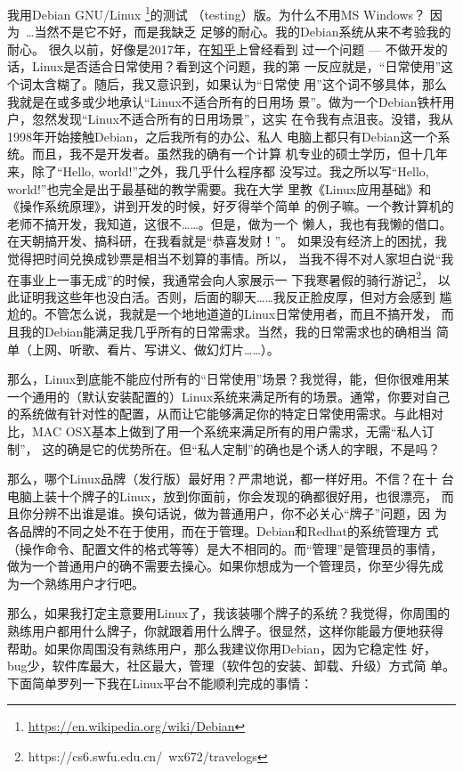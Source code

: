 我用Debian GNU/Linux%
\footnote{\url{https://en.wikipedia.org/wiki/Debian}}的测试
（testing）版。为什么不用MS Windows？ 因为~\ldots 当然不是它不好，而是我缺乏
足够的耐心。我的Debian系统从来不考验我的耐心。
很久以前，好像是2017年，在\href{https://www.zhihu.com}{知乎}上曾经看到
过一个问题 --- 不做开发的话，Linux是否适合日常使用？看到这个问题，我的第
一反应就是，“日常使用”这个词太含糊了。随后，我又意识到，如果认为“日常使
用”这个词不够具体，那么我就是在或多或少地承认“Linux不适合所有的日用场
景”。做为一个Debian铁杆用户，忽然发现“Linux不适合所有的日用场景”，这实
在令我有点沮丧。没错，我从1998年开始接触Debian，之后我所有的办公、私人
电脑上都只有Debian这一个系统。而且，我不是开发者。虽然我的确有一个计算
机专业的硕士学历，但十几年来，除了“Hello, world!”之外，我几乎什么程序都
没写过。我之所以写“Hello, world!”也完全是出于最基础的教学需要。我在大学
里教《Linux应用基础》和《操作系统原理》，讲到开发的时候，好歹得举个简单
的例子嘛。一个教计算机的老师不搞开发，我知道，这很不……。但是，做为一个
懒人，我也有我懒的借口。在天朝搞开发、搞科研，在我看就是“恭喜发财！”。
如果没有经济上的困扰，我觉得把时间兑换成钞票是相当不划算的事情。所以，
当我不得不对人家坦白说“我在事业上一事无成”的时候，我通常会向人家展示一
下我寒暑假的骑行游记\footnote{https://cs6.swfu.edu.cn/~wx672/travelogs}，%
以此证明我这些年也没白活。否则，后面的聊天……我反正脸皮厚，但对方会感到
尴尬的。不管怎么说，我就是一个地地道道的Linux日常使用者，而且不搞开发，
而且我的Debian能满足我几乎所有的日常需求。当然，我的日常需求也的确相当
简单（上网、听歌、看片、写讲义、做幻灯片……）。

那么，Linux到底能不能应付所有的“日常使用”场景？我觉得，能，但你很难用某
一个通用的（默认安装配置的）Linux系统来满足所有的场景。通常，你要对自己
的系统做有针对性的配置，从而让它能够满足你的特定日常使用需求。与此相对
比，MAC OSX基本上做到了用一个系统来满足所有的用户需求，无需“私人订制”，
这的确是它的优势所在。但“私人定制”的确也是个诱人的字眼，不是吗？

那么，哪个Linux品牌（发行版）最好用？严肃地说，都一样好用。不信？在十
台电脑上装十个牌子的Linux，放到你面前，你会发现的确都很好用，也很漂亮，
而且你分辨不出谁是谁。换句话说，做为普通用户，你不必关心“牌子”问题，因
为各品牌的不同之处不在于使用，而在于管理。Debian和Redhat的系统管理方
式（操作命令、配置文件的格式等等）是大不相同的。而“管理”是管理员的事情，
做为一个普通用户的确不需要去操心。如果你想成为一个管理员，你至少得先成
为一个熟练用户才行吧。

那么，如果我打定主意要用Linux了，我该装哪个牌子的系统？我觉得，你周围的
熟练用户都用什么牌子，你就跟着用什么牌子。很显然，这样你能最方便地获得
帮助。如果你周围没有熟练用户，那么我建议你用Debian，因为它稳定性
好，bug少，软件库最大，社区最大，管理（软件包的安装、卸载、升级）方式简
单。下面简单罗列一下我在Linux平台不能顺利完成的事情：

